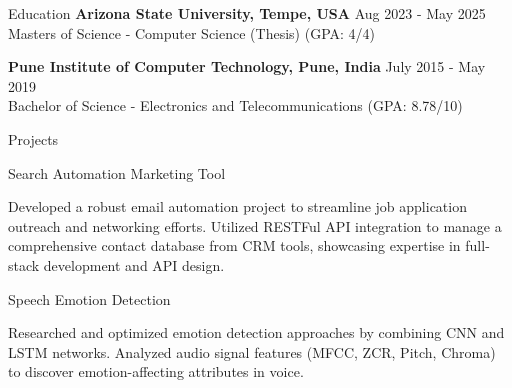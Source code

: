 \documentclass{resume} %
\begin{document}
\begin{rSection}{Education}
                        \textbf{Arizona State University, Tempe, USA} \hfill {Aug 2023 - May 2025} \\
                            {Masters of Science {-} Computer Science (Thesis)}
                                        \hfill {(GPA: 4/4)}
             
             
         
                        \textbf{Pune Institute of Computer Technology, Pune, India} \hfill {July 2015 - May 2019} \\
                            {Bachelor of Science {-} Electronics and Telecommunications}
                                        \hfill {(GPA: 8.78/10)}
             
             
         
    \end{rSection}

    \begin{rSection}{Projects}
                    \begin{rSubsection}
                                    {Search Automation Marketing Tool}
                                {}{}{}
                                    \item Developed a robust email automation project to streamline job application outreach and networking efforts. Utilized RESTFul API integration to manage a comprehensive contact database from CRM tools, showcasing expertise in full{-}stack development and API design.
                            \end{rSubsection}
                    \begin{rSubsection}
                                    {Speech Emotion Detection}
                                {}{}{}
                                    \item Researched and optimized emotion detection approaches by combining CNN and LSTM networks. Analyzed audio signal features (MFCC, ZCR, Pitch, Chroma) to discover emotion{-}affecting attributes in voice.
                            \end{rSubsection}
            \end{rSection}
\end{document}
